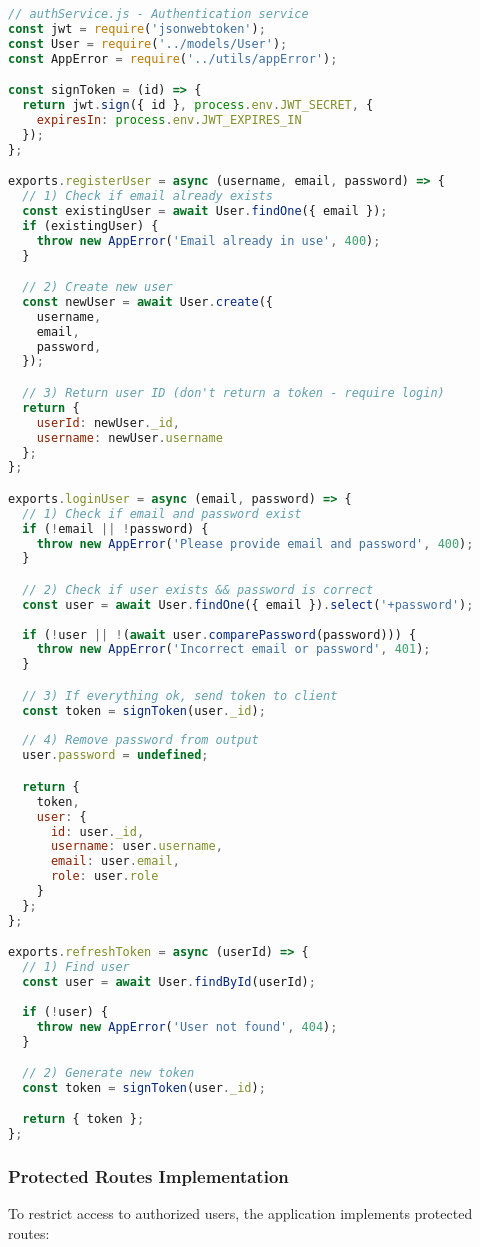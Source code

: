\documentclass[12pt,a4paper]{article}
\begin{document}
\begin{lstlisting}[language=JavaScript]
// authService.js - Authentication service
const jwt = require('jsonwebtoken');
const User = require('../models/User');
const AppError = require('../utils/appError');

const signToken = (id) => {
  return jwt.sign({ id }, process.env.JWT_SECRET, {
    expiresIn: process.env.JWT_EXPIRES_IN
  });
};

exports.registerUser = async (username, email, password) => {
  // 1) Check if email already exists
  const existingUser = await User.findOne({ email });
  if (existingUser) {
    throw new AppError('Email already in use', 400);
  }

  // 2) Create new user
  const newUser = await User.create({
    username,
    email,
    password,
  });

  // 3) Return user ID (don't return a token - require login)
  return {
    userId: newUser._id,
    username: newUser.username
  };
};

exports.loginUser = async (email, password) => {
  // 1) Check if email and password exist
  if (!email || !password) {
    throw new AppError('Please provide email and password', 400);
  }

  // 2) Check if user exists && password is correct
  const user = await User.findOne({ email }).select('+password');
  
  if (!user || !(await user.comparePassword(password))) {
    throw new AppError('Incorrect email or password', 401);
  }

  // 3) If everything ok, send token to client
  const token = signToken(user._id);
  
  // 4) Remove password from output
  user.password = undefined;

  return {
    token,
    user: {
      id: user._id,
      username: user.username,
      email: user.email,
      role: user.role
    }
  };
};

exports.refreshToken = async (userId) => {
  // 1) Find user
  const user = await User.findById(userId);
  
  if (!user) {
    throw new AppError('User not found', 404);
  }

  // 2) Generate new token
  const token = signToken(user._id);

  return { token };
};
\end{lstlisting}

\subsubsection{Protected Routes Implementation}
To restrict access to authorized users, the application implements protected routes:
\end{document}
